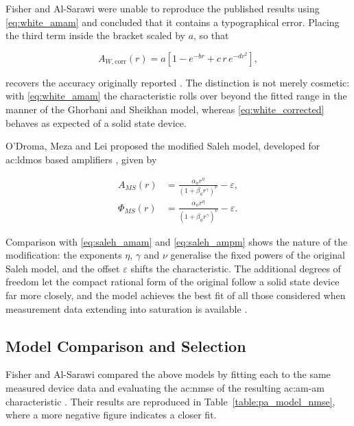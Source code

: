 Fisher and Al-Sarawi were unable to reproduce the published results using \eqref{eq:white_amam} and concluded that it contains a typographical error. Placing the third term inside the bracket scaled by $a$, so that

\begin{equation}
  A_{W,\text{corr}}(r) = a\left[1 - e^{-br} + c\,r\,e^{-dr^2}\right],
  \label{eq:white_corrected}
\end{equation}

recovers the accuracy originally reported \cite{fisher}. The distinction is not merely cosmetic: with \eqref{eq:white_amam} the characteristic rolls over beyond the fitted range in the manner of the Ghorbani and Sheikhan model, whereas \eqref{eq:white_corrected} behaves as expected of a solid state device. 

O'Droma, Meza and Lei proposed the modified Saleh model, developed for \gls{ac:ldmos} based amplifiers \cite{odroma}, given by

\begin{align}
  A_{MS}(r)    &= \frac{\alpha_a r^{\eta}}{\left(1 + \beta_a r^{\gamma}\right)^{\nu}} - \varepsilon,
                  \label{eq:modsaleh_amam} \\
  \Phi_{MS}(r) &= \frac{\alpha_\phi r^{\eta}}{\left(1 + \beta_\phi r^{\gamma}\right)^{\nu}} - \varepsilon.
                  \label{eq:modsaleh_ampm}
\end{align}

Comparison with \eqref{eq:saleh_amam} and \eqref{eq:saleh_ampm} shows the nature of the modification: the exponents $\eta$, $\gamma$ and $\nu$ generalise the fixed powers of the original Saleh model, and the offset $\varepsilon$ shifts the characteristic. The additional degrees of freedom let the compact rational form of the original follow a solid state device far more closely, and the model achieves the best fit of all those considered when measurement data extending into saturation is available \cite{fisher}.

\subsection{Model Comparison and Selection}\label{sec:pa_model_selection}

Fisher and Al-Sarawi compared the above models by fitting each to the same measured device data and evaluating the \gls{ac:nmse} of the resulting \gls{ac:am-am} characteristic \cite{fisher}. Their results are reproduced in Table~\ref{table:pa_model_nmse}, where a more negative figure indicates a closer fit.

